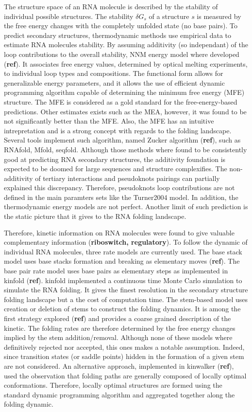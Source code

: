 \documentclass[a4paper,12pt]{article}
\begin{document}
The structure space of an RNA molecule is described by the stability of
individual possible structures. The stability \(\delta G_s\) of a structure \(s\) is
measured by the free energy changes with the completely unfolded state (no base
pairs). To predict secondary structures, thermodynamic methods use empirical
data to estimate RNA molecules stability. By assuming additivity (so
independant) of the loop contributions to the overall stability, NNM energy
model where developed (\textbf{ref}). It associates free energy values, determined by
optical melting experiments, to individual loop types and compositions. The
functional form allows for generalizable energy parameters, and it allows the
use of efficient dynamic programming algorithm capable of determining the
minimum free energy (MFE) structure. The MFE is considered as a gold standard
for the free-energy-based predictions. Other estimates exists such as the MEA,
however, it was found to be not significantly better than the MFE. Also, the MFE
has an intuitive intrepretation and is a strong concept with regards to the
folding landscape. Several tools implement such algorithm, named Zucker
algorithm (\textbf{ref}), such as RNAfold, Mfold, seqfold. Although those methods where
found to be consistently good at predicting RNA secondary structures, the
additivity foundation is expected to be doomed for large sequences and structure
complexifies. The non-additivity of tertiary interactions and pseudoknots
pairings can partially explained this discrepancy. Therefore, pseudoknots loop
contributions are not defined in the main paramters sets like the Turner2004
model. In addition, the thermodynamic energy models are not perfect. Another
limit of such prediction is the static picture that it gives to the RNA folding
landscape.

Therefore, kinetic information on RNA molecules were found to give valuable
complementary information (\textbf{riboswitch, regulatory}). To follow the dynamic of
individual RNA molecules, three rate models are currently used. The base stack
model uses base stacks formation and breaking as elementary moves (\textbf{ref}). The
base pair rate model uses base pairs as elementary steps as implemented in
kinfold (\textbf{ref}). kinfold implemented a continuous time Monte Carlo simulation to
simulate the RNA folding. It gives the finest resolution in the secondary
structure folding landscape but a the cost of computation time. The stem-based
model uses creation or deletion of stems to construct the folding dynamics. It
is among the first strategy explored (\textbf{ref}) and provides a coarse grained
description of the kinetic. The folding rates are therefore determined by the
free energy changes implied by the stem addition/removal. Although none of these
models where definitively rejected nor accepted, this ones makes a notable
assumption. Indeed, since transition states (or saddle points) hidden in the
formation of a given stem are not considered. An alternative approach,
implemented in kinwalker (\textbf{ref}), used the observation that folding paths are
generally composed of locally optimal conformations. Therefore, locally optimal
structures are formed using the standard dynamic programming algorithm and
aggregated together along the folding dynamic.
\end{document}
